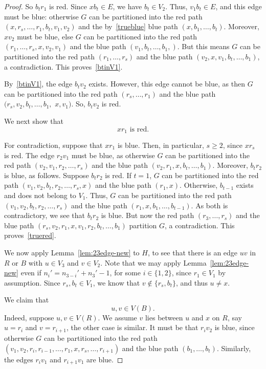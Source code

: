 \documentclass[a4paper,10pt]{article}
\begin{document}
\begin{proof}
So $b_tr_1$ is  red.
Since $xb_t\in E$, we have $b_t \in V_2$.
Thus, $v_1b_t \in E$, and this edge must be blue: otherwise $G$ can be partitioned into the red path $(x,r_s,\ldots,r_1,b_t,v_1,v_2)$ and the by~\eqref{trueblue} blue path $(x,b_1,\ldots,b_t)$.
Moreover, $xv_2$ must be blue, else $G$ can be partitioned into the red path $(r_1,\ldots,r_s,x,v_2,v_1)$ and the blue path $(v_1,b_t,\ldots,b_1,)$.
But this means $G$ can be partitioned into the red path $(r_1,\ldots,r_s)$ and the blue path $(v_2,x,v_1,b_t,\ldots,b_1)$, a contradiction.
This proves~\eqref{btinV1}.

By~\eqref{btinV1}, the edge $b_tv_2$ exists.
However, this edge cannot be blue, as then $G$ can be partitioned into the red path $(r_s,\ldots,r_1)$ and the blue path $(r_s,v_2,b_t,\ldots,b_1,$ $x,v_1)$.
So, $b_tv_2$ is red.

We next show that
\begin{equation}\label{truered}
\text{$xr_1$ is red.}
\end{equation}

For contradiction, suppose that $xr_1$ is blue.
Then, in particular, $s \ge 2$, since $xr_s$ is red.
The edge $r_2v_1$ must be blue, as otherwise $G$ can be partitioned into the red path $(v_2,v_1,r_2,\ldots,r_s)$ and the blue path $(v_2,r_1,x,b_t,\ldots,b_1)$.
Moreover, $b_tr_2$ is blue, as follows.
Suppose $b_tr_2$ is red.
If $t=1$, $G$ can be partitioned into the red path $(v_1,v_2,b_t,r_2,\ldots,r_s,x)$ and the blue path $(r_1,x)$.
Otherwise, $b_{t-1}$ exists and does not belong to $V_1$.
Thus, $G$ can be partitioned into the red path $(v_1,v_2,b_t,r_2,\ldots,r_s)$ and the blue path $(r_1,x,b_1,\ldots,b_{t-1})$.
As both is contradictory, we see that $b_tr_2$ is blue.
But now the red path $(r_3,\ldots,r_s)$ and the blue path $(r_s,v_2,r_1,x,v_1,r_2,b_t,\ldots,b_1)$ partition $G$, a contradiction. This proves~\eqref{truered}.

We now apply Lemma~\ref{lem:23edge-new} to $H$, 
to see that there is an edge $uv$ in $R$ or $B$ with $u \in V_3$ and $v \in V_2$.
Note that we may apply Lemma~\ref{lem:23edge-new} even if $n_i'=n_{3-i}'+n_3'-1$, for some $i \in \{1,2\}$, since $r_1 \in V_1$ by assumption.
Since $r_s,b_t \in V_1$, we know that $v \notin \{r_s,b_t\}$, and thus $u \neq x$.

We claim that 
\begin{equation}\label{uvareonB}
\text{$u,v \in V(B)$.}
\end{equation}
Indeed, suppose $u,v \in V(R)$.
We assume $v$ lies between $u$ and $x$ on $R$, say $u=r_i$ and $v=r_{i+1}$, the other case is similar.
It must be that $r_iv_2$ is blue, since otherwise $G$ can be partitioned into the red path $(v_1,v_2,r_i,r_{i-1},\ldots,r_1,x,r_s,\ldots,r_{i+1})$ and the blue path $(b_1,\ldots,b_t)$.
Similarly, the edges $r_iv_1$ and $r_{i+1}v_1$ are blue.


\end{proof}
\end{document}
